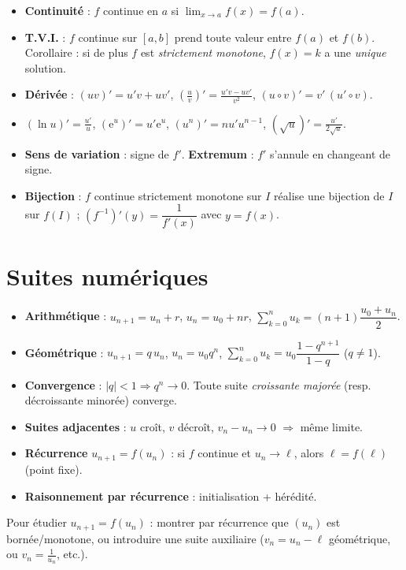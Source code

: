 \begin{itemize}
\item \textbf{Continuité} : $f$ continue en $a$ si $\lim_{x\to a}f(x)=f(a)$.
\item \textbf{T.V.I.} : $f$ continue sur $[a,b]$ prend toute valeur entre $f(a)$ et $f(b)$.
      Corollaire : si de plus $f$ est \emph{strictement monotone}, $f(x)=k$ a une \emph{unique} solution.
\item \textbf{Dérivée} : $(uv)'=u'v+uv'$, $\left(\frac uv\right)'=\frac{u'v-uv'}{v^2}$, $(u\circ v)'=v'\,(u'\circ v)$.
\item $(\ln u)'=\frac{u'}u$, $(\mathrm{e}^u)'=u'\mathrm{e}^u$, $(u^n)'=nu'u^{n-1}$, $(\sqrt u)'=\frac{u'}{2\sqrt u}$.
\item \textbf{Sens de variation} : signe de $f'$. \textbf{Extremum} : $f'$ s'annule en changeant de signe.
\item \textbf{Bijection} : $f$ continue strictement monotone sur $I$ réalise une bijection de $I$ sur $f(I)$ ;
      $(f^{-1})'(y)=\dfrac1{f'(x)}$ avec $y=f(x)$.
\end{itemize}

\section{Suites numériques}

\begin{itemize}
\item \textbf{Arithmétique} : $u_{n+1}=u_n+r$, $u_n=u_0+nr$, $\sum_{k=0}^{n}u_k=(n{+}1)\dfrac{u_0+u_n}2$.
\item \textbf{Géométrique} : $u_{n+1}=q\,u_n$, $u_n=u_0q^n$, $\sum_{k=0}^{n}u_k=u_0\dfrac{1-q^{n+1}}{1-q}$ ($q\ne1$).
\item \textbf{Convergence} : $|q|<1\Rightarrow q^n\to0$. Toute suite \emph{croissante majorée} (resp. décroissante minorée) converge.
\item \textbf{Suites adjacentes} : $u$ croît, $v$ décroît, $v_n-u_n\to0$ $\Rightarrow$ même limite.
\item \textbf{Récurrence} $u_{n+1}=f(u_n)$ : si $f$ continue et $u_n\to\ell$, alors $\ell=f(\ell)$ (point fixe).
\item \textbf{Raisonnement par récurrence} : initialisation + hérédité.
\end{itemize}

\begin{remarque}
Pour étudier $u_{n+1}=f(u_n)$ : montrer par récurrence que $(u_n)$ est bornée/monotone,
ou introduire une suite auxiliaire ($v_n=u_n-\ell$ géométrique, ou $v_n=\frac1{u_n}$, etc.).
\end{remarque}

